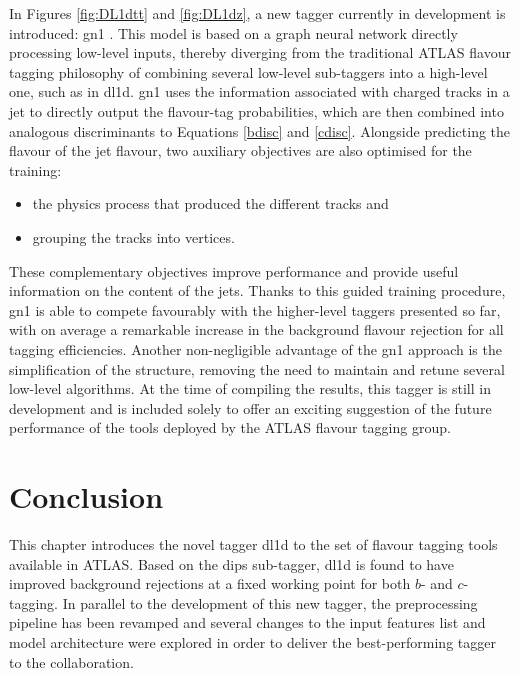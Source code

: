 In Figures \ref{fig:DL1dtt} and \ref{fig:DL1dz}, a new tagger currently in development is introduced: \gls{gn1} \cite{ATL-PHYS-PUB-2022-027}. This model is based on a graph neural network directly processing low-level inputs, thereby diverging from the traditional ATLAS flavour tagging philosophy of combining several low-level sub-taggers into a high-level one, such as in \gls{dl1d}. \gls{gn1} uses the information associated with charged tracks in a jet to directly output the flavour-tag probabilities, which are then combined into analogous discriminants to Equations \ref{bdisc} and \ref{cdisc}. Alongside predicting the flavour of the jet flavour, two auxiliary objectives are also optimised for the training: 
\begin{itemize}
\item the physics process that produced the different tracks and
\item grouping the tracks into vertices.
\end{itemize}
These complementary objectives improve performance and provide useful information on the content of the jets. Thanks to this guided training procedure, \gls{gn1} is able to compete favourably with the higher-level taggers presented so far, with on average a remarkable increase in the background flavour rejection for all tagging efficiencies. Another non-negligible advantage of the \gls{gn1} approach is the simplification of the structure, removing the need to maintain and retune several low-level algorithms. At the time of compiling the results, this tagger is still in development and is included solely to offer an exciting suggestion of the future performance of the tools deployed by the ATLAS flavour tagging group. 

\section{Conclusion}
This chapter introduces the novel tagger \gls{dl1d} to the set of flavour tagging tools available in ATLAS. Based on the \gls{dips} sub-tagger, \gls{dl1d} is found to have improved background rejections at a fixed working point for both $b$- and $c$-tagging. In parallel to the development of this new tagger, the preprocessing pipeline has been revamped and several changes to the input features list and model architecture were explored in order to deliver the best-performing tagger to the collaboration. 
\clearpage
